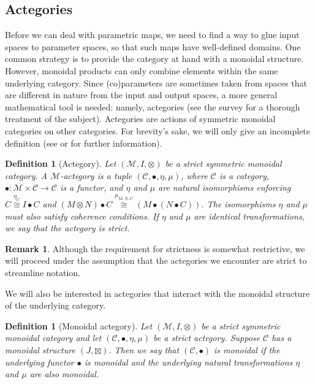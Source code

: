 \documentclass[11pt,a4paper,openright,twoside]{report}
\newcounter{mycounter}
\theoremstyle{plain}
\newtheorem{definition}[mycounter]{Definition}
\theoremstyle{definition}
\newtheorem{remark}[mycounter]{Remark}
\begin{document}
\subsection{Actegories}

Before we can deal with parametric maps, we need to find a way to glue input spaces to parameter spaces, so that such maps have well-defined domains. One common strategy is to provide the category at hand with a monoidal structure. However, monoidal products can only combine elements within the same underlying category. Since (co)parameters are sometimes taken from spaces that are different in nature from the input and output spaces, a more general mathematical tool is needed: namely, actegories (see the survey \cite{capucci2022actegories} for a thorough treatment of the subject).  Actegories are actions of symmetric monoidal categories on other categories. For brevity's sake, we will only give an incomplete definition (see \cite{capucci2022actegories} or \cite{gavranovic2024fundamental} for further information).

\begin{definition}[Actegory]
  Let $(\mathcal{M},I,\otimes)$ be a strict symmetric monoidal category. A $\mathcal{M}$-actegory is a tuple $(\mathcal{C}, \bullet, \eta, \mu)$, where $\mathcal{C}$ is a category, $\bullet: \mathcal{M} \times \mathcal{C} \to \mathcal{C}$ is a functor, and $\eta$ and $\mu$ are natural isomorphisms enforcing $C \stackrel{\eta_C}{\cong}I \bullet C$ and $(M \otimes N) \bullet C \stackrel{\mu_{M,N,C}}{\cong} (M \bullet (N \bullet C))$.
  The isomorphisms $\eta$ and $\mu$ must also satisfy coherence conditions. If $\eta$ and $\mu$ are identical transformations, we say that the actegory is strict.
\end{definition}

\begin{remark}
  Although the requirement for strictness is somewhat restrictive, we will proceed under the assumption that the actegories we encounter are strict to streamline notation.
\end{remark}

We will also be interested in actegories that interact with the monoidal structure of the underlying category.

\begin{definition}[Monoidal actegory]
  Let $(\mathcal{M},I,\otimes)$ be a strict symmetric monoidal category and let $(\mathcal{C}, \bullet, \eta, \mu)$ be a strict actegory. Suppose $\mathcal{C}$ has a monoidal structure $(J,\boxtimes)$. Then we say that $(\mathcal{C}, \bullet)$ is monoidal if the underlying functor $\bullet$ is monoidal and the underlying natural transformations $\eta$ and $\mu$ are also monoidal.
\end{definition}
\end{document}
